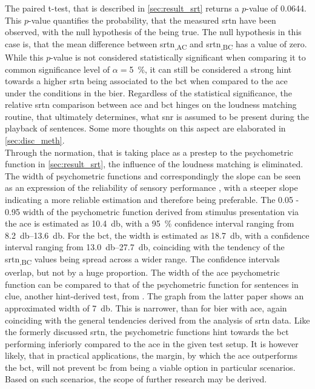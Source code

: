 The paired t-test, that is described in \autoref{sec:result_srt} returns a $p$-value of 0.0644. This $p$-value quantifies the probability, that the measured \gls{srtn} have been observed, with the null hypothesis of the being true. The null hypothesis in this case is, that the mean difference between \gls{srtn}\textsubscript{,AC} and \gls{srtn}\textsubscript{,BC} has a value of zero. 
While this $p$-value is not considered statistically significant when comparing it to common significance level of $\alpha=$\SI{5}{\percent}, it can still be considered a strong hint towards a higher \gls{srtn}  being associated to the \gls{bct} when compared to the \gls{ace} under the conditions in the \gls{bier}.
Regardless of the statistical significance, the relative \gls{srtn} comparison between \gls{ace} and \gls{bct} hinges on the loudness matching routine, that ultimately determines, what \gls{snr} is assumed to be present during the playback of sentences.
Some more thoughts on this aspect are elaborated in \autoref{sec:disc_meth}.\\
Through the normation, that is taking place as a prestep to the psychometric function in \autoref{sec:result_srt}, the influence of the loudness matching is eliminated.
The width of psychometric functions and correspondingly the slope can be seen as an expression of the reliability of sensory performance \citep{strasburger_01}, with a steeper slope indicating a more reliable estimation and therefore being preferable.
The 0.05 - 0.95 width of the psychometric function derived from stimulus presentation via the \gls{ace} is estimated as \SI{10.4}{\decibel}, with a \SI{95}{\percent} confidence interval ranging from \SIrange{8.2}{13.6}{\decibel}. For the \gls{bct}, the width is estimated as \SI{18.7}{\decibel}, with a confidence interval ranging from \SIrange{13.0}{27.7}{\decibel}, coinciding with the tendency of the \gls{srtn}\textsubscript{,BC} values being spread across a wider range. The confidence intervals overlap, but not by a huge proportion. 
The width of the \gls{ace} psychometric function can be compared to that of the psychometric function for sentences in \gls{clue}, another \gls{hint}-derived test, from \citep{nielsen_dau_09}. The graph from the latter paper shows an approximated width of \SI{7}{\decibel}. This is narrower, than for \gls{bier} with \gls{ace}, again coinciding with the general tendencies derived from the analysis of \gls{srtn} data.
Like the formerly discussed \gls{srtn}, the psychometric functions hint towards the \gls{bct} performing inferiorly compared to the \gls{ace} in the given test setup.
It is however likely, that in practical applications, the margin, by which the \gls{ace} outperforms the \gls{bct}, will not prevent \gls{bc} from being a viable option in particular scenarios.
Based on such scenarios, the scope of further research may be derived. 
 


